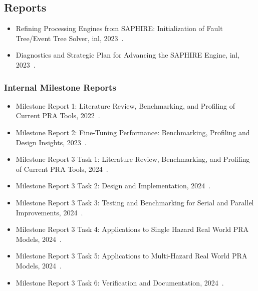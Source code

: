 \subsection{Reports}
\begin{itemize}
    \item {Refining Processing Engines from SAPHIRE: Initialization of Fault Tree/Event Tree Solver, \acrshort{inl}, 2023~\cite{aras_refining_2023}.}
    \item {Diagnostics and Strategic Plan for Advancing the SAPHIRE Engine, \acrshort{inl}, 2023~\cite{aras_diagnostics_2023}.}
\end{itemize}
\subsubsection*{Internal Milestone Reports}
\begin{itemize}
    \item {Milestone Report 1: Literature Review, Benchmarking, and Profiling of Current PRA Tools}, 2022~\cite{aras_milestone_2022}.
    \item {Milestone Report 2: Fine-Tuning Performance: Benchmarking, Profiling and Design Insights}, 2023~\cite{aras_milestone_2023}.
    \item {Milestone Report 3 Task 1: Literature Review, Benchmarking, and Profiling of Current PRA Tools}, 2024~\cite{aras_milestone_2024-1}.
    \item {Milestone Report 3 Task 2: Design and Implementation}, 2024~\cite{aras_milestone_2024-2}.
    \item {Milestone Report 3 Task 3: Testing and Benchmarking for Serial and Parallel Improvements}, 2024~\cite{aras_milestone_2024-3}.
    \item {Milestone Report 3 Task 4: Applications to Single Hazard Real World PRA Models}, 2024~\cite{aras_milestone_2024-4}.
    \item {Milestone Report 3 Task 5: Applications to Multi-Hazard Real World PRA Models}, 2024~\cite{aras_milestone_2024-5}.
    \item {Milestone Report 3 Task 6: Verification and Documentation}, 2024~\cite{rasheeq_milestone_2024-6}.
\end{itemize}